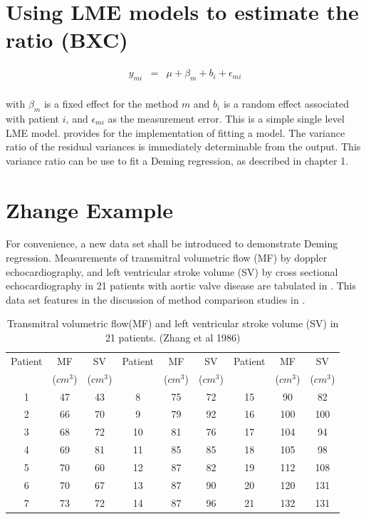 \documentclass[12pt, a4paper]{report}
\theoremstyle{plain}
\theoremstyle{definition}
\theoremstyle{remark}
\begin{document}
\section{Using LME models to estimate the ratio (BXC) }

\begin{eqnarray*}
	y_{mi} &=& \mu + \beta_{m} + b_{i} + \epsilon_{mi}\\
\end{eqnarray*}

with $\beta_{m}$ is a fixed effect for the method $m$ and $b_{i}$ is a random effect associated with patient $i$, and
$\epsilon_{mi}$ as the measurement error. This is a simple single level LME model. \citet{pb} provides for the implementation of fitting a model. The variance ratio of the residual variances is immediately determinable from the output. This variance ratio can be use to fit a Deming regression, as described in chapter 1.




\section{Zhange Example}
For convenience, a new data set shall be introduced to demonstrate Deming regression. Measurements of transmitral volumetric flow (MF) by doppler echocardiography, and left ventricular stroke volume (SV) by cross sectional echocardiography in 21 patients
with aortic valve disease are tabulated in \citet{zhang}. This data set features in the discussion of method comparison studies
in \citet[p.398]{AltmanBook} .



\begin{table}[h!]
	\begin{center}
		\begin{tabular}{|c|c|c||c|c|c||c|c|c|}
			\hline
			Patient & MF  & SV  & Patient & MF  & SV  & Patient & MF  & SV \\
			&($cm^{3}$)&  ($cm^{3}$) & &($cm^{3}$)&  ($cm^{3}$) & &($cm^{3}$)&  ($cm^{3}$)
			\\
			\hline
			1 & 47 & 43 &  8 & 75 & 72 &  15 & 90 & 82 \\
			2 & 66 & 70 & 9 & 79 & 92 &  16 & 100 & 100 \\
			3 & 68 & 72 & 10 & 81 & 76 & 17 & 104 & 94 \\
			4 & 69 & 81 & 11 & 85 & 85 &  18 & 105 & 98 \\
			5 & 70 & 60 & 12 & 87 & 82 & 19 & 112 & 108 \\
			6 & 70 & 67 & 13 & 87 & 90 & 20 & 120 & 131 \\
			7 & 73 & 72 & 14 & 87 & 96 &  21 & 132 & 131 \\
			
			\hline
		\end{tabular}
		\caption{Transmitral volumetric flow(MF) and left ventricular
			stroke volume (SV) in 21 patients. (Zhang et al 1986)}
	\end{center}
\end{table}
\end{document}
